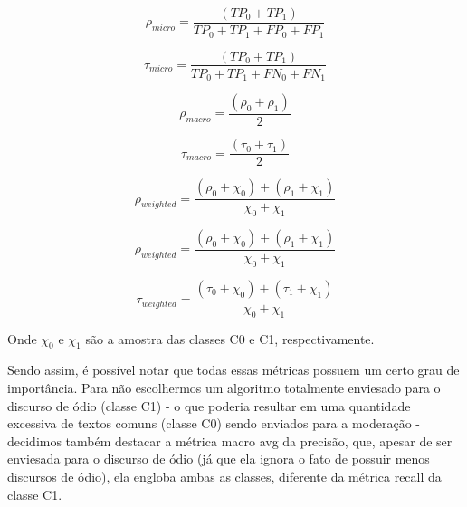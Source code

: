 $$ 
\rho_{micro} = 
\frac{(TP_0+TP_1)}{TP_0+TP_1+FP_0+FP_1} 
$$

$$ 
\tau_{micro} = 
\frac{(TP_0+TP_1)}{TP_0+TP_1+FN_0+FN_1} 
$$

$$ 
\rho_{macro} = 
\frac{(\rho_0+\rho_1)}{2} 
$$

$$ 
\tau_{macro} = 
\frac{(\tau_0+\tau_1)}{2} 
$$

$$ 
\rho_{weighted} = 
\frac{(\rho_0+\chi_0)+(\rho_1+\chi_1)}{\chi_0+\chi_1} 
$$

$$ 
\rho_{weighted} = 
\frac{(\rho_0+\chi_0)+(\rho_1+\chi_1)}{\chi_0+\chi_1} 
$$

$$ 
\tau_{weighted} = 
\frac{(\tau_0+\chi_0)+(\tau_1+\chi_1)}{\chi_0+\chi_1} 
$$

Onde $\chi_0$  e $\chi_1$ são a amostra das classes C0 e C1, respectivamente.

Sendo assim, é possível notar que todas essas métricas possuem um certo grau de importância. Para não escolhermos um algoritmo totalmente enviesado para o discurso de ódio (classe C1) - o que poderia resultar em uma quantidade excessiva de textos comuns (classe C0) sendo enviados para a moderação - decidimos também destacar a métrica macro avg da precisão, que, apesar de ser enviesada para o discurso de ódio (já que ela ignora o fato de possuir menos discursos de ódio), ela engloba ambas as classes, diferente da métrica recall da classe C1.